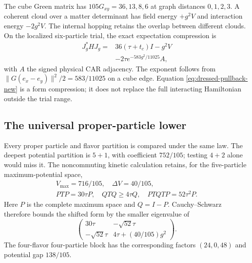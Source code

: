 The cube Green matrix has $105G_{xy}=36,13,8,6$ at graph distances
$0,1,2,3$. A coherent cloud over a matter determinant has field energy
$+g^2V$ and interaction energy $-2g^2V$. The internal hopping retains the
overlap between different clouds. On the localized six-particle trial,
the exact expectation compression is
\begin{equation}
\begin{split}
J_g^*HJ_g={}&36(\tau+t_c)I-g^2V\\
&-2\tau e^{-583g^2/11025}A,
\end{split}
\label{eq:dressed-pullback-new}
\end{equation}
with $A$ the signed physical CAR adjacency. The exponent follows from
$\|G(e_x-e_y)\|^2/2=583/11025$ on a cube edge. Equation
\eqref{eq:dressed-pullback-new} is a form compression; it does not replace
the full interacting Hamiltonian outside the trial range.

\subsection{The universal proper-particle lower}
\label{sec:proper-lower-new}

Every proper particle and flavor partition is compared under the same law.
The deepest potential partition is $5+1$, with coefficient $752/105$;
testing $4+2$ alone would miss it. The noncommuting kinetic calculation
retains, for the five-particle maximum-potential space,
\begin{equation}
\begin{gathered}
V_{\max}=716/105,\quad \Delta V=40/105,\\
PTP=30\tau P,\quad QTQ\geq4\tau Q,\quad
PTQTP=52\tau^2P.
\end{gathered}
\end{equation}
Here $P$ is the complete maximum space and $Q=I-P$. Cauchy--Schwarz
therefore bounds the shifted form by the smaller eigenvalue of
\begin{equation}
\begin{pmatrix}
30\tau&-\sqrt{52}\tau\\
-\sqrt{52}\tau&4\tau+(40/105)g^2
\end{pmatrix}.
\end{equation}
The four-flavor four-particle block has the corresponding factors
$(24,0,48)$ and potential gap $138/105$.


